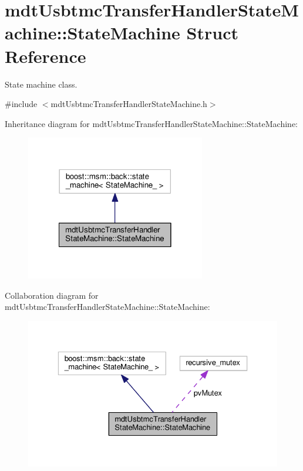 \hypertarget{structmdt_usbtmc_transfer_handler_state_machine_1_1_state_machine}{\section{mdt\-Usbtmc\-Transfer\-Handler\-State\-Machine\-:\-:State\-Machine Struct Reference}
\label{structmdt_usbtmc_transfer_handler_state_machine_1_1_state_machine}
}


State machine class.  




{\ttfamily \#include $<$mdt\-Usbtmc\-Transfer\-Handler\-State\-Machine.\-h$>$}



Inheritance diagram for mdt\-Usbtmc\-Transfer\-Handler\-State\-Machine\-:\-:State\-Machine\-:\nopagebreak
\begin{figure}[H]
\begin{center}
\leavevmode
\includegraphics[width=222pt]{structmdt_usbtmc_transfer_handler_state_machine_1_1_state_machine__inherit__graph}
\end{center}
\end{figure}


Collaboration diagram for mdt\-Usbtmc\-Transfer\-Handler\-State\-Machine\-:\-:State\-Machine\-:\nopagebreak
\begin{figure}[H]
\begin{center}
\leavevmode
\includegraphics[width=329pt]{structmdt_usbtmc_transfer_handler_state_machine_1_1_state_machine__coll__graph}
\end{center}
\end{figure}

